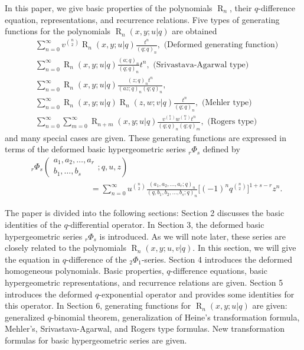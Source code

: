 \documentclass{cimart}
\DeclareMathOperator{\opR}{R}
\begin{document}
In this paper, we give basic properties of the polynomials $\opR_{n}$, their $q$-difference equation, representations, and recurrence relations. Five types of generating functions for the polynomials $\opR_{n}(x,y;u|q)$ are obtained
\begin{align*}
    &\sum_{n=0}^{\infty}v^{\binom{n}{2}}\opR_{n}(x,y;u|q)\frac{t^n}{(q;q)_{n}},\text{  (Deformed generating function)}\\
    &\sum_{n=0}^{\infty}\opR_{n}(x,y;u|q)\frac{(a;q)_{n}}{(q;q)_{n}}t^n,\text{  (Srivastava-Agarwal type)}\\
    &\sum_{n=0}^{\infty}\opR_{n}(x,y;u|q)\frac{(z;q)_{n}t^n}{(az;q)_{n}(q;q)_{n}},\\
    &\sum_{n=0}^{\infty}\opR_{n}(x,y;u|q)\opR_{n}(z,w;v|q)\frac{t^n}{(q;q)_{n}},\text{  (Mehler type)}\\
    &\sum_{n=0}^{\infty}\sum_{m=0}^{\infty}\opR_{n+m}(x,y;u|q)\frac{v^{\binom{n}{2}}w^{\binom{m}{2}}t^n}{(q;q)_{n}(q;q)_{m}},\text{  (Rogers type)}
\end{align*}
and many special cases are given. These generating functions are expressed in terms of the deformed basic hypergeometric series ${}_{r}\Phi_{s}$ defined by
\begin{align}
        &{}_{r}\Phi_{s}\left(
    \begin{array}{c}
         a_{1},a_{2},\ldots,a_{r} \\
         b_{1},\ldots,b_{s}
    \end{array}
    ;q,u,z
    \right)\nonumber\\
    &\hspace{3cm}=\sum_{n=0}^{\infty}u^{\binom{n}{2}}\frac{(a_{1},a_{2},\ldots,a_{r};q)_{n}}{(q,b_{1},b_{2},\ldots,b_{s};q)_{n}}\bigg[(-1)^nq^{\binom{n}{2}}\bigg]^{1+s-r}z^n.                
    \end{align}

The paper is divided into the following sections: Section 2 discusses the basic identities of the $q$-differential operator. In Section 3, the deformed basic hypergeometric series ${}_{r}\Phi_{s}$ is introduced. As we will note later, these series are closely related to the polynomials $\opR_{n}(x,y;u,v|q)$. In this section, we will give the equation in $q$-difference of the ${}_{2}\Phi_{1}$-series. Section 4 introduces the deformed homogeneous polynomials. Basic properties, $q$-difference equations, basic hypergeometric representations, and recurrence relations are given. Section 5 introduces the deformed $q$-exponential operator and provides some identities for this operator. In Section 6, generating functions for $\opR_{n}(x,y;u|q)$ are given: generalized $q$-binomial theorem, generalization of Heine's transformation formula, Mehler's, Srivastava-Agarwal, and Rogers type formulas. New transformation formulas for basic hypergeometric series are given.
\end{document}
